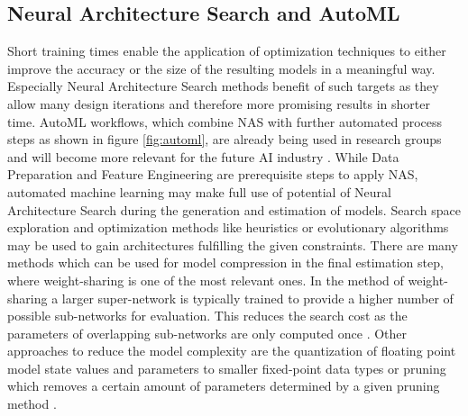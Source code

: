 \documentclass[10pt,        %
               a4paper,     %
               journal,     %
               ]{IEEEtran}
\begin{document}
\subsection{Neural Architecture Search and AutoML}
Short training times enable the application of optimization techniques to either improve the accuracy or the size of the resulting models in a meaningful way. Especially Neural Architecture Search methods benefit of such targets as they allow many design iterations and therefore more promising results in shorter time. AutoML workflows, which combine NAS with further automated process steps as shown in figure \ref{fig:automl}, are already being used in research groups and will become more relevant for the future AI industry \cite{automl2019}. While Data Preparation and Feature Engineering are prerequisite steps to apply NAS, automated machine learning may make full use of potential of Neural Architecture Search during the generation and estimation of models. Search space exploration and optimization methods like heuristics or evolutionary algorithms may be used to gain architectures fulfilling the given constraints. There are many methods which can be used for model compression in the final estimation step, where weight-sharing is one of the most relevant ones. In the method of weight-sharing a larger super-network is typically trained to provide a higher number of possible sub-networks for evaluation. This reduces the search cost as the parameters of overlapping sub-networks are only computed once \cite{Chu2019}. Other approaches to reduce the model complexity are the quantization of floating point model state values and parameters to smaller fixed-point data types or pruning which removes a certain amount of parameters determined by a given pruning method \cite{Molchanov2019}.
\end{document}
